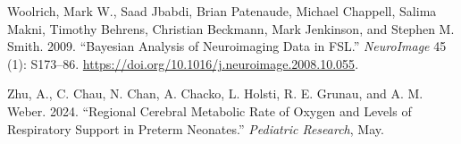 \documentclass[
sn-nature
]{sn-jnl}
\newlength{\cslhangindent}
\newenvironment{CSLReferences}[2] %
 {\begin{list}{}{%
  \setlength{\itemindent}{0pt}
  \setlength{\leftmargin}{0pt}
  \setlength{\parsep}{0pt}
  \ifodd #1
   \setlength{\leftmargin}{\cslhangindent}
   \setlength{\itemindent}{-1\cslhangindent}
  \fi
  \setlength{\itemsep}{#2\baselineskip}}}
 {\end{list}}
\begin{document}
\begin{CSLReferences}{1}{0}
Woolrich, Mark W., Saad Jbabdi, Brian Patenaude, Michael Chappell,
Salima Makni, Timothy Behrens, Christian Beckmann, Mark Jenkinson, and
Stephen M. Smith. 2009. {``Bayesian Analysis of Neuroimaging Data in
{FSL}.''} \emph{NeuroImage} 45 (1): S173--86.
\url{https://doi.org/10.1016/j.neuroimage.2008.10.055}.

Zhu, A., C. Chau, N. Chan, A. Chacko, L. Holsti, R. E. Grunau, and A. M.
Weber. 2024. {``Regional Cerebral Metabolic Rate of Oxygen and Levels of
Respiratory Support in Preterm Neonates.''} \emph{Pediatric Research},
May.

\end{CSLReferences}
\end{document}
